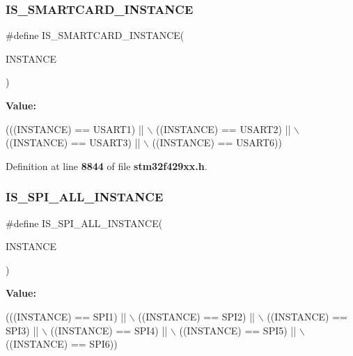\subsubsection{I\+S\+\_\+\+S\+M\+A\+R\+T\+C\+A\+R\+D\+\_\+\+I\+N\+S\+T\+A\+N\+CE}
{\footnotesize\ttfamily \#define I\+S\+\_\+\+S\+M\+A\+R\+T\+C\+A\+R\+D\+\_\+\+I\+N\+S\+T\+A\+N\+CE(\begin{DoxyParamCaption}\item[{}]{I\+N\+S\+T\+A\+N\+CE }\end{DoxyParamCaption})}

{\bfseries Value\+:}
\begin{DoxyCode}
(((INSTANCE) == USART1) || \(\backslash\)
                                         ((INSTANCE) == USART2) || \(\backslash\)
                                         ((INSTANCE) == USART3) || \(\backslash\)
                                         ((INSTANCE) == USART6))
\end{DoxyCode}


Definition at line \textbf{ 8844} of file \textbf{ stm32f429xx.\+h}.

\mbox{\label{group__Exported__macros_ga59c7619a86c03df3ebeb4bd8aaef982c}} 
\subsubsection{I\+S\+\_\+\+S\+P\+I\+\_\+\+A\+L\+L\+\_\+\+I\+N\+S\+T\+A\+N\+CE}
{\footnotesize\ttfamily \#define I\+S\+\_\+\+S\+P\+I\+\_\+\+A\+L\+L\+\_\+\+I\+N\+S\+T\+A\+N\+CE(\begin{DoxyParamCaption}\item[{}]{I\+N\+S\+T\+A\+N\+CE }\end{DoxyParamCaption})}

{\bfseries Value\+:}
\begin{DoxyCode}
(((INSTANCE) == SPI1) || \(\backslash\)
                                       ((INSTANCE) == SPI2) || \(\backslash\)
                                       ((INSTANCE) == SPI3) || \(\backslash\)
                                       ((INSTANCE) == SPI4) || \(\backslash\)
                                       ((INSTANCE) == SPI5) || \(\backslash\)
                                       ((INSTANCE) == SPI6))
\end{DoxyCode}


